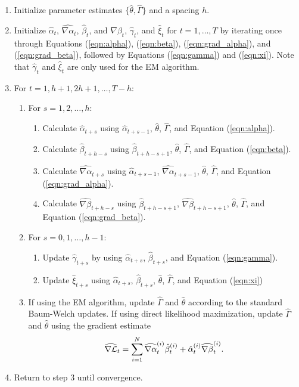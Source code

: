 \begin{enumerate}
    \item Initialize parameter estimates $\{\hat \theta,\hat \Gamma\}$ and a spacing $h$.
    \item Initialize $\hat \alpha_{t}$, $\widehat{\nabla \alpha}_{t}$, $\hat \beta_{t}$, and $\widehat{\nabla \beta}_{t}$, $\hat \gamma_t$, and $\hat \xi_t$ for $t=1,\ldots,T$ by iterating once through Equations (\ref{eqn:alpha}), (\ref{eqn:beta}), (\ref{eqn:grad_alpha}), and (\ref{eqn:grad_beta}), followed by Equations (\ref{eqn:gamma}) and (\ref{eqn:xi}). Note that $\hat \gamma_t$ and $\hat \xi_t$ are only used for the EM algorithm.
    \item For $t = 1,h+1,2h+1,\ldots,T-h$:
    \begin{enumerate}
        \item For $s = 1,2,\ldots,h$:
        \begin{enumerate}
            \item Calculate $\hat \alpha_{t+s}$ using $\hat \alpha_{t+s-1}$, $\hat \theta$, $\hat \Gamma$, and Equation (\ref{eqn:alpha}).
            \item Calculate $\hat \beta_{t+h-s}$ using $\hat \beta_{t+h-s+1}$, $\hat \theta$, $\hat \Gamma$, and Equation (\ref{eqn:beta}).
            \item Calculate $\widehat{\nabla \alpha}_{t+s}$ using $\hat \alpha_{t+s-1}$, $\widehat{\nabla \alpha}_{t+s-1}$, $\hat \theta$, $\hat \Gamma$, and Equation (\ref{eqn:grad_alpha}).
            \item Calculate $\widehat{\nabla \beta}_{t+h-s}$ using $\hat \beta_{t+h-s+1}$, $\widehat{\nabla \beta}_{t+h-s+1}$, $\hat \theta$, $\hat \Gamma$, and Equation (\ref{eqn:grad_beta}).
        \end{enumerate}
        \item For $s = 0,1,\ldots,h-1$:
        \begin{enumerate}
            \item Update $\hat \gamma_{t+s}$ by using $\hat \alpha_{t+s}$, $\hat \beta_{t+s}$, and Equation (\ref{eqn:gamma}). 
            \item Update $\hat \xi_{t+s}$ using $\hat \alpha_{t+s}$, $\hat \beta_{t+s}$, $\hat \theta$, $\hat \Gamma$, and Equation (\ref{eqn:xi})
        \end{enumerate}
        \item If using the EM algorithm, update $\hat \Gamma$ and $\hat \theta$ according to the standard Baum-Welch updates. If using direct likelihood maximization, update $\hat \Gamma$ and $\hat \theta$ using the gradient estimate $$\widehat{\nabla \mathcal{L}}_{t} = \sum_{i=1}^N \widehat{\nabla \alpha}_{t}^{(i)} \hat \beta_{t}^{(i)} + \hat \alpha_{t}^{(i)} \widehat{\nabla \beta}_{t}^{(i)}.$$
    \end{enumerate}
    \item Return to step 3 until convergence.
\end{enumerate}

